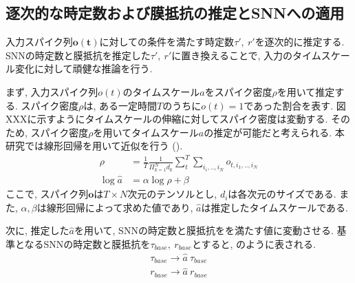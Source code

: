 \makeatletter %
\subsection{逐次的な時定数および膜抵抗の推定とSNNへの適用}
入力スパイク列$\bm{o(t)}$に対しての条件を満たす時定数$\tau',~r'$を逐次的に推定する.
SNNの時定数と膜抵抗を推定した$\tau',~r'$に置き換えることで, 入力のタイムスケール変化に対して頑健な推論を行う.

まず, 入力スパイク列$o(t)$のタイムスケール$a$をスパイク密度$\rho$を用いて推定する.
スパイク密度$\rho$は, ある一定時間$T$のうちに$o(t)=1$であった割合を表す.
図XXXに示すようにタイムスケールの伸縮に対してスパイク密度は変動する.
そのため, スパイク密度$\rho$を用いてタイムスケール$a$の推定が可能だと考えられる.
本研究では線形回帰を用いて近似を行う ().
\begin{equation}
    \begin{split}
        \rho&=\frac{1}{T} \frac{1}{\Pi_{k=1}^{N}d_k} \sum_t^T \sum_{i_i,..,i_N}o_{t,i_1,..,i_N}\\
        \log{\hat{a}}&=\alpha \log{\rho} + \beta
    \end{split}
    \label{sec2:eq:reg}
\end{equation}
ここで, スパイク列$\bm{o}$は$T \times N$次元のテンソルとし, $d_i$は各次元のサイズである.
また, $\alpha, \beta$は線形回帰によって求めた値であり, $\hat{a}$は推定したタイムスケールである.

次に, 推定した$\hat{a}$を用いて, SNNの時定数と膜抵抗をを満たす値に変動させる.
基準となるSNNの時定数と膜抵抗を$\tau_{base},~r_{base}$とすると, のように表される.
\begin{equation}
    \begin{split}
        \tau_{base} \rightarrow \hat{a}~\tau_{base}\\
        r_{base} \rightarrow \hat{a}~r_{base}\\
    \end{split}
    \label{sec2:eq:replace}
\end{equation}